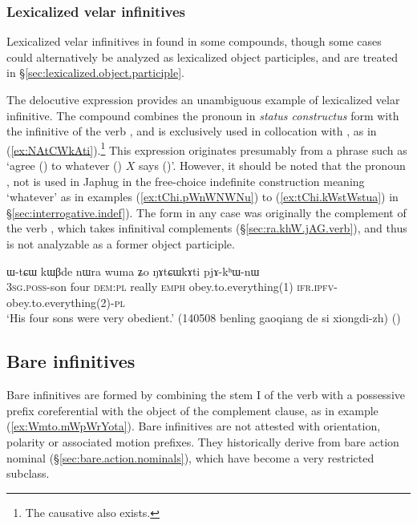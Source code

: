 \subsubsection{Lexicalized velar infinitives}    \label{sec:lexicalized.velar.inf}
Lexicalized velar infinitives in  found in some compounds, though some cases could alternatively be analyzed as lexicalized object participles, and are treated in §\ref{sec:lexicalized.object.participle}.

The delocutive expression  provides an unambiguous example of lexicalized velar infinitive. The compound  combines the pronoun  in \textit{status constructus} form  with the  infinitive  of the verb , and is exclusively used in collocation with , as in (\ref{ex:NAtCWkAti}).\footnote{The causative  also exists.} 
This expression originates presumably from a phrase such as `agree () to whatever () $X$ says ()'. However, it should be noted that the pronoun , not  is used in Japhug in the free-choice indefinite construction meaning `whatever' as in examples (\ref{ex:tChi.pWnWNWNu}) to (\ref{ex:tChi.kWstWstua}) in §\ref{sec:interrogative.indef}). The form  in any case was originally the complement of the verb , which takes infinitival complements (§\ref{sec:ra.khW.jAG.verb}), and thus is not analyzable as a former object participle.

 \begin{exe}
\ex \label{ex:NAtCWkAti}
\gll  ɯ-tɕɯ kɯβde nɯra wuma ʑo ŋɤtɕɯkɤti pjɤ-kʰɯ-nɯ  \\
\textsc{3sg}.\textsc{poss}-son four \textsc{dem}:\textsc{pl} really \textsc{emph} obey.to.everything(1) \textsc{ifr}.\textsc{ipfv}-obey.to.everything(2)-\textsc{pl} \\
\glt `His four sons were very obedient.' (140508 benling gaoqiang de si xiongdi-zh)
()
\end{exe} 

\subsection{Bare infinitives} \label{sec:bare.inf}
Bare infinitives are formed by combining the stem I of the verb with a possessive prefix coreferential with the object of the complement clause, as in example (\ref{ex:Wmto.mWpWrYota}). Bare infinitives are not attested with orientation, polarity or associated motion prefixes. They historically derive from bare action nominal (§\ref{sec:bare.action.nominals}), which have become a very restricted subclass.

